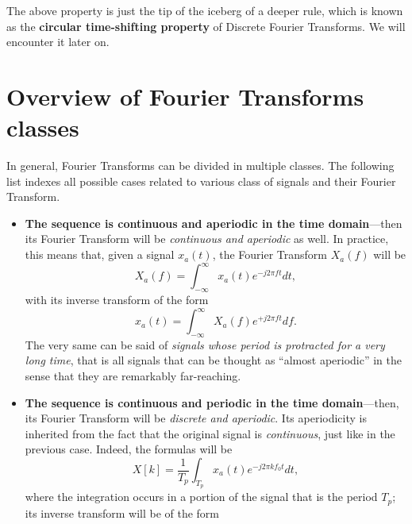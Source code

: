 \documentclass[\documentfontsize, twocolumn]{\classname}
\begin{document}
The above property is just the tip of the iceberg of a deeper rule, which is known as the \textbf{circular time-shifting property} of Discrete Fourier Transforms. We will encounter it later on.

\section{Overview of Fourier Transforms classes}

In general, Fourier Transforms can be divided in multiple classes. The following list indexes all possible cases related to various class of signals and their Fourier Transform.

\begin{itemize}
    \item \textbf{The sequence is continuous and aperiodic in the time domain}---then its Fourier Transform will be \emph{continuous and aperiodic} as well. In practice, this means that, given a signal $x_a(t)$, the Fourier Transform $X_a(f)$ will be
        \begin{equation}\label{eqn:fourierTransformContinuousAperiodic}
            X_a(f) = \int_{-\infty}^\infty x_a(t) e^{-j2\pi ft} dt,
        \end{equation}
        with its inverse transform of the form
        \begin{equation}\label{eqn:inverseFourierTransformContinuousAperiodic}
            x_a(t) = \int_{-\infty}^\infty X_a(f) e^{+j2\pi ft} df.
        \end{equation}
        The very same can be said of \emph{signals whose period is protracted for a very long time}, that is all signals that can be thought as ``almost aperiodic'' in the sense that they are remarkably far-reaching.
    \item \textbf{The sequence is continuous and periodic in the time domain}---then, its Fourier Transform will be \emph{discrete and aperiodic}. Its aperiodicity is inherited from the fact that the original signal is \emph{continuous}, just like in the previous case. Indeed, the formulas will be
        \begin{equation}\label{eqn:fourierTransformContinuousPeriodic}
            X[k] = \frac{1}{T_p}\int_{T_p} x_a(t) e^{-j2\pi kf_0t} dt,
        \end{equation}
        where the integration occurs in a portion of the signal that is the period $T_p$; its inverse transform will be of the form
        \begin{equation}\label{eqn:inverseFourierTransformContinuousPeriodic}

\end{equation}
\end{itemize}
\end{document}
